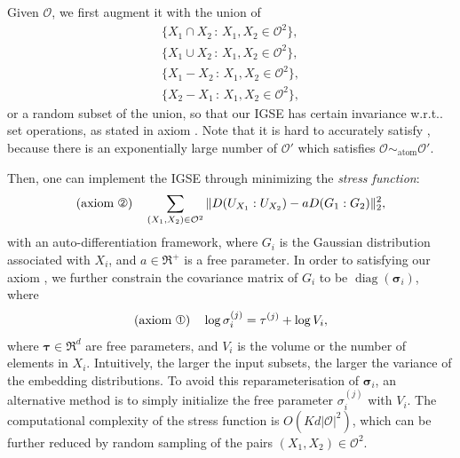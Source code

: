 \documentclass{article}
\makeatletter
\DeclareMathOperator*{\diag}{\mathrm{diag}}
\DeclareRobustCommand\onedot{\futurelet\@let@token\bmv@onedotaux}
\def\bmv@onedotaux{\ifx\@let@token.\else.\null\fi\xspace}
\def\wrt{w.r.t\onedot} \def\Wrt{W.r.t\onedot}
\makeatother
\begin{document}
Given $\mathcal{O}$, we first augment it with the union of
\begin{align*}
\{X_1\cap{}X_2 \,:\, X_1, X_2\in\mathcal{O}^2\},\\
\{X_1\cup{}X_2 \,:\, X_1, X_2\in\mathcal{O}^2\},\\
\{X_1-X_2 \,:\, X_1, X_2\in\mathcal{O}^2\},\\
\{X_2-X_1 \,:\, X_1, X_2\in\mathcal{O}^2\},
\end{align*}
or a random subset of the union,
so that our IGSE has certain invariance \wrt set operations, as stated in
axiom . Note that it is hard to accurately satisfy ,
because there is an exponentially large number of
$\mathcal{O}'$ which satisfies $\mathcal{O}\sim_{\mathrm{atom}}\mathcal{O}'$.

Then, one can implement the IGSE through minimizing the {\em stress function}:
\begin{equation}\label{eq:stress}
\text{(axiom \ding{193})}\quad
\sum_{(X_1,X_2)\in\mathcal{O}^2} \Vert D(U_{X_1}:U_{X_2}) - a D(G_1: G_2)\Vert_2^2,
\end{equation}
with an auto-differentiation framework,
where $G_i$ is the Gaussian distribution associated with $X_i$,
and $a\in\Re^+$ is a free parameter.
In order to satisfying our axiom ,
we further constrain the covariance matrix of $G_{i}$ to be
$\diag(\bm\sigma_i)$, where
\begin{equation*}
\text{(axiom \ding{192})}\quad
\log \sigma_i^{(j)} = \tau^{(j)} + \log{}V_i,
\end{equation*}
where $\bm\tau\in\Re^d$ are free parameters, and $V_i$ is the volume or the
number of elements in $X_i$.  Intuitively, the larger the input subsets, the
larger the variance of the embedding distributions.
To avoid this reparameterisation of $\bm\sigma_i$,
an alternative method is to simply initialize the free parameter $\sigma_i^{(j)}$ with $V_i$.
The computational complexity of the stress function is $O(Kd\vert\mathcal{O}\vert^2)$,
which can be further reduced by random sampling of the pairs
$(X_1,X_2)\in\mathcal{O}^2$.
\end{document}

